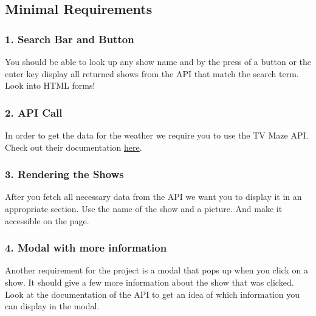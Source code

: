 \documentclass[
]{article}
\begin{document}
\hypertarget{minimal-requirements}{%
\subsection{Minimal Requirements}\label{minimal-requirements}}

\hypertarget{search-bar-and-button}{%
\subsubsection*{1. Search Bar and Button}\label{search-bar-and-button}}

You should be able to look up any show name and by the press of a button or the enter key display all returned shows from the API that match the search term. Look into HTML forms!

\hypertarget{api-call}{%
\subsubsection*{2. API Call}\label{api-call}}

In order to get the data for the weather we require you to use the TV Maze API. Check out their documentation \href{https://www.tvmaze.com/api}{here}.

\hypertarget{rendering-the-shows}{%
\subsubsection*{3. Rendering the Shows}\label{rendering-the-shows}}

After you fetch all necessary data from the API we want you to display it in an appropriate section. Use the name of the show and a picture. And make it accessible on the page.

\hypertarget{modal-with-more-information}{%
\subsubsection*{4. Modal with more information}\label{modal-with-more-information}}

Another requirement for the project is a modal that pops up when you click on a show. It should give a few more information about the show that was clicked. Look at the documentation of the API to get an idea of which information you can display in the modal.
\end{document}
